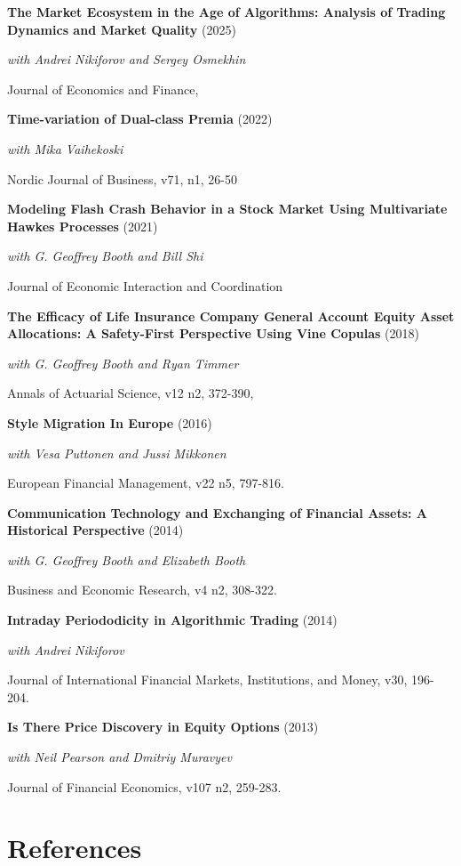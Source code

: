 \documentclass[11pt,a4paper,]{awesome-cv}
\let\oldtextbf\textbf
\renewcommand{\textbf}[1]{\oldtextbf{#1}\vspace{-1mm}}
\begin{document}
\textbf{The Market Ecosystem in the Age of Algorithms: Analysis of Trading Dynamics and Market Quality}
(2025)

\textit{with Andrei Nikiforov and Sergey Osmekhin}

Journal of Economics and Finance,

\textbf{Time-variation of Dual-class Premia} (2022)

\textit{with Mika Vaihekoski}

Nordic Journal of Business, v71, n1, 26-50

\textbf{Modeling Flash Crash Behavior in a Stock Market Using Multivariate Hawkes Processes}
(2021)

\textit{with G. Geoffrey Booth and Bill Shi}

Journal of Economic Interaction and Coordination

\textbf{The Efficacy of Life Insurance Company General Account Equity Asset Allocations: A Safety-First Perspective Using Vine Copulas}
(2018)

\textit{with G. Geoffrey Booth and Ryan Timmer}

Annals of Actuarial Science, v12 n2, 372-390,

\textbf{Style Migration In Europe} (2016)

\textit{with Vesa Puttonen and Jussi Mikkonen}

European Financial Management, v22 n5, 797-816.

\textbf{Communication Technology and Exchanging of Financial Assets: A Historical Perspective}
(2014)

\textit{with G. Geoffrey Booth and Elizabeth Booth}

Business and Economic Research, v4 n2, 308-322.

\textbf{Intraday Periododicity in Algorithmic Trading} (2014)

\textit{with Andrei Nikiforov}

Journal of International Financial Markets, Institutions, and Money,
v30, 196-204.

\textbf{Is There Price Discovery in Equity Options} (2013)

\textit{with Neil Pearson and Dmitriy Muravyev}

Journal of Financial Economics, v107 n2, 259-283.

\section{References}\label{references}
\end{document}
